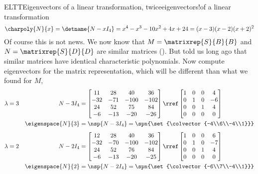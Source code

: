 \begin{example}{ELTT}{Eigenvectors of a linear transformation, twice}{eigenvectors!of a linear transformation}
%
\begin{equation*}
\charpoly{N}{x}=\detname{N-xI_4}=x^4-x^3-10 x^2+4 x+24=(x-3) (x-2) (x+2)^2
\end{equation*}
%
Of course this is not news.  We now know that $M=\matrixrep{S}{B}{B}$ and $N=\matrixrep{S}{D}{D}$ are similar matrices ().  But  told us long ago that similar matrices have identical characteristic polynomials.  Now compute eigenvectors for the matrix representation,  which will be different than what we found for $M$,
%
\begin{align*}
\lambda&=3&N-3I_4&=
\begin{bmatrix}
 11 & 28 & 40 & 36 \\
 -32 & -71 & -100 & -102 \\
 24 & 52 & 75 & 84 \\
 -6 & -13 & -20 & -26
\end{bmatrix}
\rref
\begin{bmatrix}
 1 & 0 & 0 & 4 \\
 0 & 1 & 0 & -6 \\
 0 & 0 & 1 & 4 \\
 0 & 0 & 0 & 0
\end{bmatrix}\\
&&\eigenspace{N}{3}&=\nsp{N-3I_4}
=\spn{\set{\colvector{-4\\6\\-4\\1}}}
\end{align*}
%
\begin{align*}
\lambda&=2&N-2I_4&=
\begin{bmatrix}
 12 & 28 & 40 & 36 \\
 -32 & -70 & -100 & -102 \\
 24 & 52 & 76 & 84 \\
 -6 & -13 & -20 & -25
\end{bmatrix}
\rref
\begin{bmatrix}
 1 & 0 & 0 & 6 \\
 0 & 1 & 0 & -7 \\
 0 & 0 & 1 & 4 \\
 0 & 0 & 0 & 0
\end{bmatrix}\\
&&\eigenspace{N}{2}&=\nsp{N-2I_4}
=\spn{\set{\colvector{-6\\7\\-4\\1}}}
\end{align*}
%
\begin{align*}

\end{align*}
\end{example}
